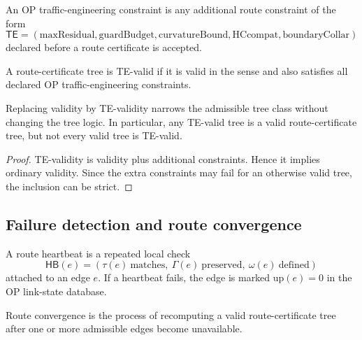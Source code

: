 \begin{definition}
\label{def:v410r13-op-traffic-engineering-constraint}
An OP traffic-engineering constraint is any additional route constraint of the
form
\[
 \mathsf{TE}
 =
 (\mathrm{maxResidual},\mathrm{guardBudget},\mathrm{curvatureBound},
 \mathrm{HCcompat},\mathrm{boundaryCollar})
\]
declared before a route certificate is accepted.
\end{definition}

\begin{definition}
\label{def:v410r13-te-valid-route-tree}
A route-certificate tree is TE-valid if it is valid in the sense and also
satisfies all declared OP traffic-engineering constraints.
\end{definition}

\begin{proposition}
\label{prop:v410r13-te-validity-sharpens-route-admissibility}
Replacing validity by TE-validity narrows the admissible tree class without
changing the tree logic. In particular, any TE-valid tree is a valid
route-certificate tree, but not every valid tree is TE-valid.
\end{proposition}

\begin{proof}
TE-validity is validity plus additional constraints. Hence it implies
ordinary validity. Since the extra constraints may fail for an otherwise valid
tree, the inclusion can be strict.
\end{proof}

\subsection{Failure detection and route convergence}
\label{subsec:v410r13-failure-detection-route-convergence}

\begin{definition}
\label{def:v410r13-route-heartbeat}
A route heartbeat is a repeated local check
\[
 \mathsf{HB}(e)
 =
 (\tau(e)\ \mathrm{matches},\ \Gamma(e)\ \mathrm{preserved},\
 \omega(e)\ \mathrm{defined})
\]
attached to an edge \(e\). If a heartbeat fails, the edge is marked
\(\mathrm{up}(e)=0\) in the OP link-state database.
\end{definition}

\begin{definition}
\label{def:v410r13-route-convergence}
Route convergence is the process of recomputing a valid route-certificate tree
after one or more admissible edges become unavailable.
\end{definition}

